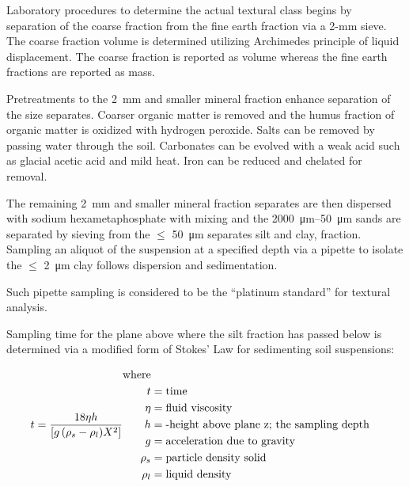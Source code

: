 \documentclass[letterpaper, 12pt]{article}
\begin{document}
Laboratory procedures to determine the actual textural class begins by separation of the coarse fraction from the fine earth fraction via a 2-mm sieve. The coarse fraction volume is determined utilizing Archimedes principle of liquid displacement. The coarse fraction is reported as volume whereas the fine earth fractions are reported as mass.

Pretreatments to the 2~mm and smaller mineral fraction enhance separation of the size separates. Coarser organic matter is removed and the humus fraction of organic matter is oxidized with hydrogen peroxide. Salts can be removed by passing water through the soil. Carbonates can be evolved with a weak acid such as glacial acetic acid and mild heat. Iron can be reduced and chelated for removal.

The remaining \qty{2}{mm} and smaller mineral fraction separates are then dispersed with sodium hexametaphosphate with mixing and the \qtyrange{2000}{50}{\micro\metre} sands are separated by sieving from the $\leq$ \qty{50}{\micro\metre} separates silt and clay, fraction. Sampling an aliquot of the suspension at a specified depth via a pipette to isolate the $\leq$ \qty{2}{\micro\metre} clay follows dispersion and sedimentation.

Such pipette sampling is considered to be the “platinum standard” for textural analysis.

Sampling time for the plane above where the silt fraction has passed below is determined via a modified form of Stokes’ Law for sedimenting soil suspensions:

\begin{equation}
    t=\frac{18\eta h} {[g\,(\rho_s - \rho_l)X^2]}            \\
    \begin{aligned}
        \text{where}                                          \\
        t &= \text{time}                                      \\
        \eta &= \text{fluid viscosity}                        \\
        h &= \text{-height above plane z; the sampling depth} \\
        g &= \text{acceleration due to gravity}               \\
        \rho_s &= \text{particle density solid}               \\
        \rho_l &= \text{liquid density}                       \\
    \end{aligned}
\end{equation}
        
\end{document}
